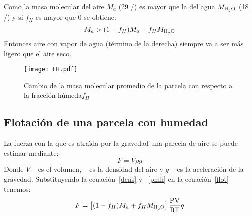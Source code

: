 Como la masa molecular del aire $M_a$ (29 \gram/\mole) es mayor que la del agua $M_{\ce{H2O}}$  (18 \gram/\mole) y si  $f_H$ es mayor que $0$ se obtiene:
 \begin{equation}
M_a> (1-f_H)M_a + f_H M_{\ce{H2O}}
\label{rel1}
\end{equation}
Entonces aire con vapor de agua (t\'ermino de la derecha) siempre va a ser m\'as ligero que el aire seco.
\begin{figure}[htbp]
\begin{center}
\texttt{[image: FH.pdf]}

\caption[Peso molecular aire-agua]{Cambio de la masa molecular promedio de la parcela con respecto a  la fracci\'on h\'umeda$f_H$ }
\label{fig_fh}
\end{center}
\end{figure}

\subsection{Flotaci\'on de una parcela con humedad}

La fuerza con la que es atra\'{\i}da por la gravedad una parcela de aire se puede estimar mediante:
\begin{equation}
F=V\rho g
\label{flot}
\end{equation}
Donde $V$ -- es el volumen,  -- es la densidad del aire y $g$  --  es la aceleraci\'on de la gravedad. Substituyendo la  ecuaci\'on~\ref{dens} y ~\ref{pmh} en la ecuaci\'on~\ref{flot} tenemos:
\begin{equation}
F=\left[  (1-f_H)M_a + f_H M_{\ce{H2O}}\right] \frac{\textrm{PV}}{\textrm{RT}}g
\label{fb}
\end{equation}

